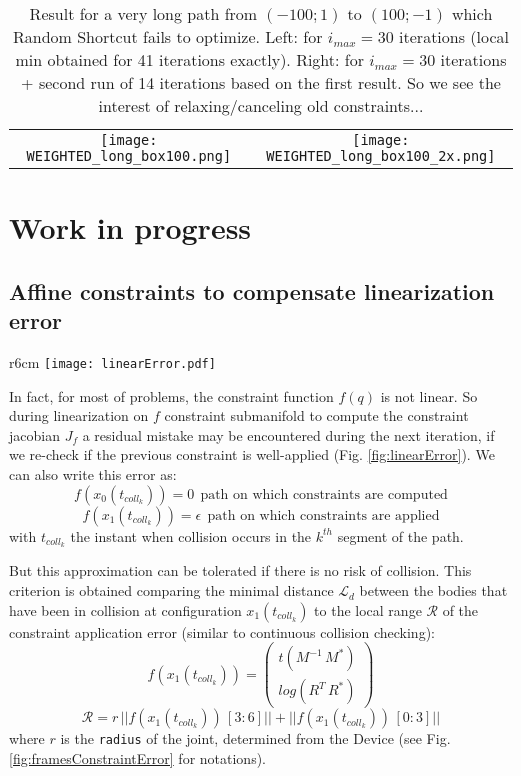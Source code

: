 \documentclass {article}
\newcommand\tcollk{t_{coll_k}}
\begin{document}
\begin{table}[h]
\centering
\begin{tabular}{cc}
	\texttt{[image: WEIGHTED\_long\_box100.png]} &
	\texttt{[image: WEIGHTED\_long\_box100\_2x.png]}
\end{tabular}
	\caption{Result for a very long path from $(-100;1)$ to $(100;-1)$ which
	Random Shortcut fails to optimize. Left: for $i_{max} = 30$ iterations
	(local min obtained for 41 iterations exactly). Right: for $i_{max} = 30$
	iterations + second run of 14 iterations based on the first result. So we see
	the interest of relaxing/canceling old constraints...}
\end{table}

\vspace{0.4cm}

\newpage
\section{Work in progress}

\subsection{Affine constraints to compensate linearization error}

\begin{wrapfigure}[9]{r}{6cm}
	\texttt{[image: linearError.pdf]}
	\caption{Linearization error.}
	\label{fig:linearError}
\end{wrapfigure}

In fact, for most of problems, the constraint function $f(q)$ is not linear. So during linearization on  $f$ constraint submanifold to compute the constraint jacobian $J_f$ a residual mistake may be encountered during the next iteration, if we re-check if the previous constraint is well-applied (Fig. \ref{fig:linearError}). We can also write this error as:
$$
f(x_0(\tcollk)) = 0 \ \ \text{path on which constraints are computed}
$$
$$
f(x_1(\tcollk)) = \epsilon \ \ \text{path on which constraints are applied}
$$
with $\tcollk$ the instant when collision occurs in the $k^{th}$ segment of the path.

\vspace{0.2cm}

But this approximation can be tolerated if there is no risk of collision. This criterion is
obtained comparing the minimal distance $\mathscr{L}_d$ between the bodies that have been in collision at configuration $x_1(\tcollk)$
to the local range $\mathscr{R}$ of the constraint application error (similar to continuous collision checking):
$$
f(x_1(\tcollk)) =
\begin{pmatrix}
t(M^{-1}\, M^*) \\
log(R^T\,R^*)
\end{pmatrix}
$$
$$
\mathscr{R} = r \, ||f(x_1(\tcollk))\,[3:6]|| + ||f(x_1(\tcollk))\,[0:3]||
$$
where $r$ is the \texttt{radius} of the joint, determined from the Device (see Fig. \ref{fig:framesConstraintError} for notations).
\end{document}
